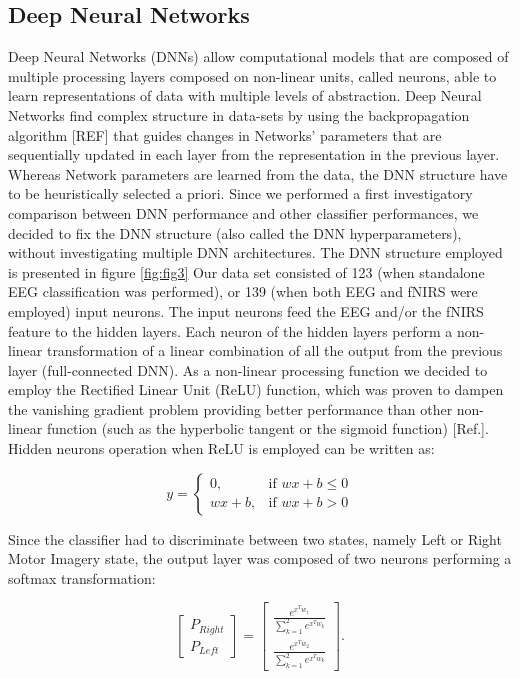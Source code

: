 \documentclass[12pt ]{iopart}
\begin{document}
\subsection{Deep Neural Networks}
Deep Neural Networks (DNNs) allow computational models that are composed of multiple  processing layers composed on non-linear units, called neurons, able to learn representations of data with multiple levels of abstraction.
Deep Neural Networks find complex structure in  data-sets by using the backpropagation algorithm [REF] that guides changes in Networks' parameters that are sequentially updated in each layer from the representation in the previous layer.
Whereas Network parameters are learned from the data, the DNN structure have to be heuristically selected a priori.
Since we performed a first investigatory comparison between DNN performance and other classifier performances, we decided to fix the DNN structure (also called the DNN hyperparameters), without investigating multiple DNN architectures.
The DNN structure employed is presented in figure \ref{fig:fig3}
Our data set consisted of 123 (when standalone EEG classification was performed), or 139 (when both EEG and fNIRS were employed) input neurons. The input neurons feed the EEG and/or the fNIRS feature to the  hidden layers.
Each neuron of the hidden layers perform a non-linear transformation of a linear combination of all the output from the previous layer (full-connected DNN). As a non-linear processing function we decided to employ the Rectified Linear Unit (ReLU) function, which was proven to dampen the vanishing gradient problem providing better performance than other non-linear function (such as the hyperbolic tangent or the sigmoid function) [Ref.]. Hidden neurons operation when ReLU is employed can be written as:

\begin{equation}
y=
\begin{cases}
0,& \text{if } wx+b \leq 0\\
wx+b,&\text{if } wx+b > 0
\end{cases}
\end{equation}


Since the classifier had to discriminate between two states, namely Left or Right Motor Imagery state, the output layer was composed of two neurons performing a softmax transformation:

\begin{equation}
\begin{bmatrix}
P_{Right}\\
P_{Left}
\end{bmatrix}
=
\begin{bmatrix}
\frac{e^{x^Tw_1}}{\sum\limits_{k=1}^2 e^{x^Tw_k}}\\
\frac{e^{x^Tw_2}}{\sum\limits_{k=1}^2 e^{x^Tw_k}}
\end{bmatrix}
.
\end{equation}
\end{document}
